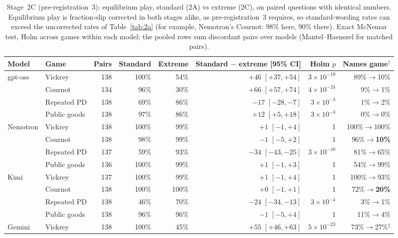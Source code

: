 \documentclass[11pt]{article}
\theoremstyle{definition}
\theoremstyle{remark}
\begin{document}
\begin{table}[t]
\centering
\caption{Stage~2C (pre-registration~3): equilibrium play, standard (2A) vs extreme (2C), on paired
questions with identical numbers. Equilibrium play is fraction-slip corrected in both stages
alike, as pre-registration~3 requires, so standard-wording rates can exceed the uncorrected
rates of Table~\ref{tab:2a} (for example, Nemotron's Cournot: 98\% here, 90\% there). Exact
McNemar test, Holm across games within each model; the pooled rows sum discordant pairs over
models (Mantel--Haenszel for matched pairs).}
\label{tab:2c}
\footnotesize
\setlength{\tabcolsep}{4pt}
\begin{tabular}{@{}llrrrrrr@{}}
\toprule
Model & Game & Pairs & Standard & Extreme & Standard $-$ extreme [95\% CI] & Holm $p$ & Names game$^\dagger$ \\
\midrule
gpt-oss  & Vickrey      & 138 & 100\% & 54\% & $+46$ $[+37,+54]$ & $3\times10^{-19}$ & 89\%$\to$10\% \\
         & Cournot      & 134 & 96\%  & 30\% & $+66$ $[+57,+74]$ & $4\times10^{-24}$ & 9\%$\to$1\% \\
         & Repeated PD  & 138 & 69\%  & 86\% & $-17$ $[-28,-7]$ & $3\times10^{-3}$ & 1\%$\to$2\% \\
         & Public goods & 138 & 97\%  & 86\% & $+12$ $[+5,+18]$ & $3\times10^{-3}$ & 0\%$\to$0\% \\
\midrule
Nemotron & Vickrey      & 138 & 100\% & 99\% & $+1$ $[-1,+4]$ & 1 & 100\%$\to$100\% \\
         & Cournot      & 138 & 98\%  & 99\% & $-1$ $[-5,+2]$ & 1 & 96\%$\to$\textbf{10\%} \\
         & Repeated PD  & 137 & 59\%  & 93\% & $-34$ $[-43,-25]$ & $3\times10^{-10}$ & 81\%$\to$65\% \\
         & Public goods & 136 & 100\% & 99\% & $+1$ $[-1,+3]$ & 1 & 54\%$\to$99\% \\
\midrule
Kimi     & Vickrey      & 137 & 100\% & 99\% & $+1$ $[-1,+4]$ & 1 & 100\%$\to$93\% \\
         & Cournot      & 138 & 100\% & 100\% & $+0$ $[-1,+1]$ & 1 & 72\%$\to$\textbf{20\%} \\
         & Repeated PD  & 138 & 46\%  & 70\% & $-24$ $[-34,-13]$ & $3\times10^{-4}$ & 3\%$\to$1\% \\
         & Public goods & 138 & 96\%  & 96\% & $-1$ $[-5,+4]$ & 1 & 11\%$\to$4\% \\
\midrule
Gemini   & Vickrey      & 138 & 100\% & 45\% & $+55$ $[+46,+63]$ & $5\times10^{-23}$ & 73\%$\to$27\%$^\ddagger$ \\

\end{tabular}
\end{table}
\end{document}
